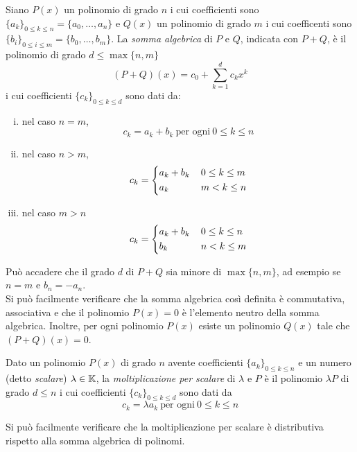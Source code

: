 \begin{definition}
    \label{def:1.2}
    Siano $P(x)$ un polinomio di grado $n$ i cui coefficienti sono $\{a_k\}_{0\le k \le n} = \{a_0, \dots, a_n\}$ e $Q(x)$ un polinomio di grado $m$ i cui coefficenti sono $\{b_i\}_{0\le i \le m} = \{b_0, \dots, b_m\}$. La \emph{somma algebrica} di $P$ e $Q$, indicata con $P+Q$, è il polinomio di grado $d \le \max\{n,m\}$
    \[
    (P+Q)(x) = c_0 + \sum_{k=1}^{d}c_k x^k
    \]
    i cui coefficienti $\{c_k\}_{0\le k \le d}$ sono dati da:
    \begin{enumerate}[(i)]
        \item nel caso $n=m$,  
        \[
        c_k = a_k + b_k \ \text{per ogni} \ 0\le k \le n 
        \]
        \item nel caso $n>m$, 
        \[
        c_k = \begin{dcases}
            a_k + b_k\, & 0\le k \le m\\
            a_k\, & m<k\le n
        \end{dcases}
        \]
        \item nel caso $m>n$
        \[
        c_k = \begin{dcases}
            a_k + b_k\, & 0\le k \le n\\
            b_k\, & n<k\le m
        \end{dcases}
        \]
    \end{enumerate}
\end{definition}
\begin{remark}
    Può accadere che il grado $d$ di $P+Q$ sia minore di $\max\{n,m\}$, ad esempio se $n=m$ e $b_n = -a_n$.\\
    Si può facilmente verificare che la somma algebrica così definita è commutativa, associativa e che il polinomio $P(x)=0$ è l'elemento neutro della somma algebrica. Inoltre, per ogni polinomio $P(x)$ esiste un polinomio $Q(x)$ tale che $(P+Q)(x)=0$.
\end{remark}
\begin{definition}
    \label{def:1.3}
    Dato un polinomio $P(x)$ di grado $n$ avente coefficienti $\{a_k\}_{0\le k \le n}$ e un numero (detto \emph{scalare}) $\lambda\in \amsbb{K}$, la \emph{moltiplicazione per scalare} di $\lambda$ e $P$ è il polinomio $\lambda P$ di grado $d\le n$ i cui coefficienti $\{c_k\}_{0\le k \le d}$ sono dati da
    \[
    c_k = \lambda a_k \ \text{per ogni} \ 0\le k \le n
    \]
\end{definition}
\begin{remark}
    Si può facilmente verificare che la moltiplicazione per scalare è distributiva rispetto alla somma algebrica di polinomi.
\end{remark}
